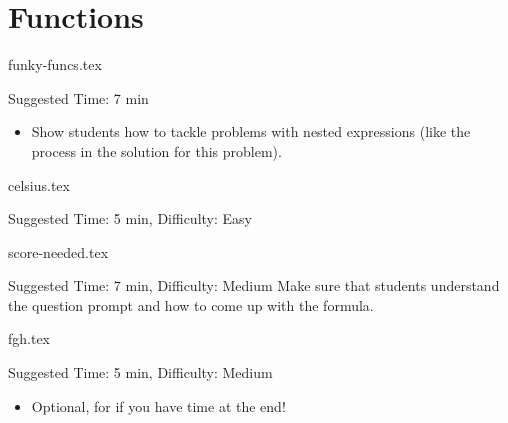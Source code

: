 \documentclass{exam}
\begin{document}
\section{Functions}
\begin{questions}
    {funky-funcs.tex}
    \begin{questionmeta}
        Suggested Time: 7 min
        \begin{itemize}
            \item Show students how to tackle problems with nested expressions (like the process in the solution for this problem).
        \end{itemize}
    \end{questionmeta}

    {celsius.tex}
    \begin{questionmeta}
        Suggested Time: 5 min, Difficulty: Easy
    \end{questionmeta}

    {score-needed.tex}
    \begin{questionmeta}
    Suggested Time: 7 min, Difficulty: Medium
    Make sure that students understand the question prompt and how to come up with the formula.
    \end{questionmeta}

    {fgh.tex}
    \begin{questionmeta}
        Suggested Time: 5 min, Difficulty: Medium
        \begin{itemize}
            \item Optional, for if you have time at the end!
        \end{itemize}
    \end{questionmeta}
\end{questions}
\end{document}
